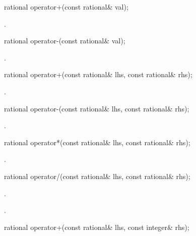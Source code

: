 \begin{itemdecl}
rational operator+(const rational& val);
\end{itemdecl}

\begin{itemdescr}
\returns {}.
\end{itemdescr}

\begin{itemdecl}
rational operator-(const rational& val);
\end{itemdecl}

\begin{itemdescr}
\returns {}.
\end{itemdescr}

\begin{itemdecl}
rational operator+(const rational& lhs, const rational& rhs);
\end{itemdecl}

\begin{itemdescr}
\returns {}.
\end{itemdescr}

\begin{itemdecl}
rational operator-(const rational& lhs, const rational& rhs);
\end{itemdecl}

\begin{itemdescr}
\returns {}.
\end{itemdescr}

\begin{itemdecl}
rational operator*(const rational& lhs, const rational& rhs);
\end{itemdecl}

\begin{itemdescr}
\returns {}.
\end{itemdescr}

\begin{itemdecl}
rational operator/(const rational& lhs, const rational& rhs);
\end{itemdecl}

\begin{itemdescr}
\requires {}.

\returns {}.
\end{itemdescr}

\begin{itemdecl}
rational operator+(const rational& lhs, const integer& rhs);
\end{itemdecl}

